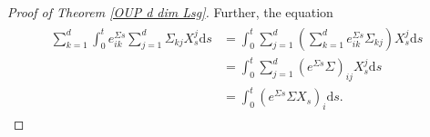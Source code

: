 \documentclass[11pt,titlepage]{article}
\theoremstyle{definition}
\theoremstyle{remark}
\begin{document}
\begin{proof}[Proof of Theorem \ref{OUP d dim Lsg}]
		Further, the equation
		\begin{align}
			\begin{split}
				\sum_{k=1}^d \int_0^t e^{\Sigma s}_{ik} \sum_{j=1}^d \Sigma_{kj} X_s^j \mathrm{d}s &= \int_0^t \sum_{j=1}^d\left(\sum_{k=1}^d e^{\Sigma s}_{ik} \Sigma_{kj}\right)X_s^j\mathrm{d}s\\
				&=\int_0^t \sum_{j=1}^d (e^{\Sigma s}\Sigma)_{ij}X_s^j\mathrm{d}s\\
				&=\int_0^t (e^{\Sigma s}\Sigma X_s)_i \mathrm{d}s. \label{NR:ito1}

\end{split}
\end{align}
\end{proof}
\end{document}
